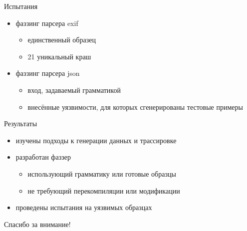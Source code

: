 \documentclass[hyperref={unicode=true}, 12pt]{beamer}
\begin{document}
	\begin{frame}[c]{Испытания}
		
		\begin{itemize}
			\item фаззинг парсера exif 
				\begin{itemize}
					\fontsize{11}{15}\selectfont
					\item единственный образец
					
					\item 21 уникальный краш
				\end{itemize}
	
			
			\item фаззинг парсера json
			
			\begin{itemize}
				\fontsize{11}{15}\selectfont
				\item вход, задаваемый грамматикой
				
				\item внесённые уязвимости, для которых сгенерированы тестовые примеры
			\end{itemize}
		\end{itemize}
		
		\vspace{0.3cm}
		
	\end{frame}

	\begin{frame}[c]{Результаты}
		
		\begin{itemize}
			\item изучены подходы к генерации данных и трассировке
			
			\item разработан фаззер
			\begin{itemize}
				\fontsize{11}{15}\selectfont
				\item использующий грамматику или готовые образцы
				\item не требующий перекомпиляции или модификации
			\end{itemize}
			\item проведены испытания на уязвимых образцах
		\end{itemize}
	
	\end{frame}

	\begin{frame}[c]
		\fontsize{26}{24}\selectfont
		\centering Спасибо за внимание!
	\end{frame}
	
\end{document}
